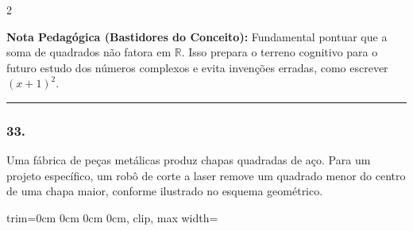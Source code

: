 \begin{multicols*}{2}
    \begin{boxexplicacao}
    \textbf{Nota Pedagógica (Bastidores do Conceito):} Fundamental pontuar que a soma de quadrados não fatora em $\mathbb{R}$. Isso prepara o terreno cognitivo para o futuro estudo dos números complexos e evita invenções erradas, como escrever $(x+1)^2$.
    \end{boxexplicacao}
\fi

\par\vspace{\espacoQuestao}


\noindent\textcolor{CorLinha}{\rule{\linewidth}{0.5pt}} 
\par\vspace{\espacoPreQuestao}
\subsubsection*{33.} 
\begin{enunciadoLiteral}
Uma fábrica de peças metálicas produz chapas quadradas de aço. Para um projeto específico, um robô de corte a laser remove um quadrado menor do centro de uma chapa maior, conforme ilustrado no esquema geométrico.

\begin{center}
\begin{adjustbox}{trim=0cm 0cm 0cm 0cm, clip, max width=\larguraTikz}
\end{adjustbox}
\end{center}
\end{enunciadoLiteral}
\end{multicols*}
